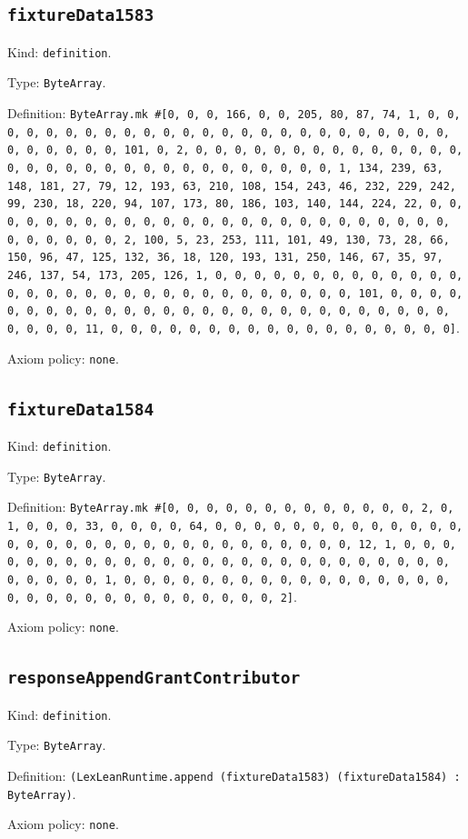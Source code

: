 \documentclass[11pt]{article}
\begin{document}
\subsection*{\texttt{fixtureData1583}}
\noindent Kind: \texttt{definition}.\par
\noindent Type: \texttt{ByteArray}.\par
\noindent Definition: \texttt{ByteArray.mk \#[0, 0, 0, 166, 0, 0, 205, 80, 87, 74, 1, 0, 0, 0, 0, 0, 0, 0, 0, 0, 0, 0, 0, 0, 0, 0, 0, 0, 0, 0, 0, 0, 0, 0, 0, 0, 0, 0, 0, 0, 0, 0, 101, 0, 2, 0, 0, 0, 0, 0, 0, 0, 0, 0, 0, 0, 0, 0, 0, 0, 0, 0, 0, 0, 0, 0, 0, 0, 0, 0, 0, 0, 0, 0, 0, 0, 1, 134, 239, 63, 148, 181, 27, 79, 12, 193, 63, 210, 108, 154, 243, 46, 232, 229, 242, 99, 230, 18, 220, 94, 107, 173, 80, 186, 103, 140, 144, 224, 22, 0, 0, 0, 0, 0, 0, 0, 0, 0, 0, 0, 0, 0, 0, 0, 0, 0, 0, 0, 0, 0, 0, 0, 0, 0, 0, 0, 0, 0, 0, 0, 2, 100, 5, 23, 253, 111, 101, 49, 130, 73, 28, 66, 150, 96, 47, 125, 132, 36, 18, 120, 193, 131, 250, 146, 67, 35, 97, 246, 137, 54, 173, 205, 126, 1, 0, 0, 0, 0, 0, 0, 0, 0, 0, 0, 0, 0, 0, 0, 0, 0, 0, 0, 0, 0, 0, 0, 0, 0, 0, 0, 0, 0, 0, 0, 0, 101, 0, 0, 0, 0, 0, 0, 0, 0, 0, 0, 0, 0, 0, 0, 0, 0, 0, 0, 0, 0, 0, 0, 0, 0, 0, 0, 0, 0, 0, 0, 0, 11, 0, 0, 0, 0, 0, 0, 0, 0, 0, 0, 0, 0, 0, 0, 0, 0, 0, 0]}.\par
\noindent Axiom policy: \texttt{none}.\par
\subsection*{\texttt{fixtureData1584}}
\noindent Kind: \texttt{definition}.\par
\noindent Type: \texttt{ByteArray}.\par
\noindent Definition: \texttt{ByteArray.mk \#[0, 0, 0, 0, 0, 0, 0, 0, 0, 0, 0, 0, 0, 2, 0, 1, 0, 0, 0, 33, 0, 0, 0, 0, 64, 0, 0, 0, 0, 0, 0, 0, 0, 0, 0, 0, 0, 0, 0, 0, 0, 0, 0, 0, 0, 0, 0, 0, 0, 0, 0, 0, 0, 0, 0, 0, 12, 1, 0, 0, 0, 0, 0, 0, 0, 0, 0, 0, 0, 0, 0, 0, 0, 0, 0, 0, 0, 0, 0, 0, 0, 0, 0, 0, 0, 0, 0, 0, 0, 1, 0, 0, 0, 0, 0, 0, 0, 0, 0, 0, 0, 0, 0, 0, 0, 0, 0, 0, 0, 0, 0, 0, 0, 0, 0, 0, 0, 0, 0, 0, 0, 2]}.\par
\noindent Axiom policy: \texttt{none}.\par
\subsection*{\texttt{responseAppendGrantContributor}}
\noindent Kind: \texttt{definition}.\par
\noindent Type: \texttt{ByteArray}.\par
\noindent Definition: \texttt{(LexLeanRuntime.append (fixtureData1583) (fixtureData1584) : ByteArray)}.\par
\noindent Axiom policy: \texttt{none}.\par
\end{document}
